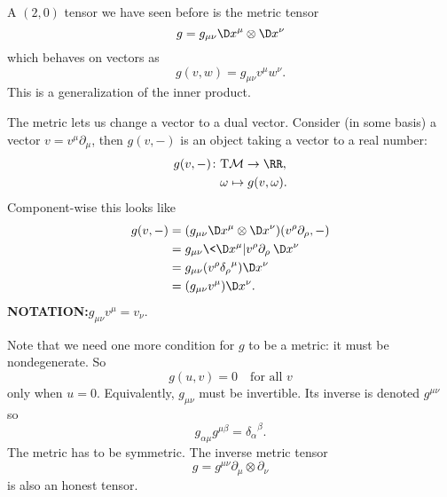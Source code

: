 \begin{ex}
A $(2,0)$ tensor we have seen before is the metric tensor
\begin{equation}
g=g_{\mu\nu}\D x^{\mu}\otimes\D x^{\nu}
\end{equation}
which behaves on vectors as
\begin{equation}
g(v,w)=g_{\mu\nu}v^{\mu}w^{\nu}.
\end{equation}
This is a generalization of the inner product.

The metric lets us change a vector to a dual vector. Consider (in
some basis) a vector $v=v^{\mu}\partial_{\mu}$, then $g(v,-)$ is
an object taking a vector to a real number:
\begin{equation}
\begin{split}
g(v,-)\colon &\mathrm{T}\mathcal{M}\to\RR,\\
&\omega\mapsto g(v,\omega).
\end{split}
\end{equation}
Component-wise this looks like
\begin{subequations}
\begin{align}
g(v,-)
&=(g_{\mu\nu}\D x^{\mu}\otimes\D
x^{\nu})(v^{\rho}\partial_{\rho},-)\\
&=g_{\mu\nu}\<\D x^{\mu}|v^{\rho}\partial_{\rho}\>\D x^{\nu}\\
&=g_{\mu\nu}(v^{\rho}{\delta_{\rho}}^{\mu})\D x^{\nu}\\
&=(g_{\mu\nu}v^{\mu})\D x^{\nu}.
\end{align}
\end{subequations}
\textbf{NOTATION:\quad}\ignorespaces $g_{\mu\nu}v^{\mu}=v_{\nu}$.

Note that we need one more condition for $g$ to be a metric: it
must be nondegenerate. So
\begin{equation}
g(u,v)=0\quad\mbox{for all }v
\end{equation}
only when $u=0$.
Equivalently, $g_{\mu\nu}$ must be invertible. Its inverse is
denoted $g^{\mu\nu}$ so 
\begin{equation}
g_{\alpha\mu}g^{\mu\beta}={\delta_{\alpha}}^{\beta}.
\end{equation}
The metric has to be symmetric. The inverse metric tensor
\begin{equation}
g=g^{\mu\nu}\partial_{\mu}\otimes\partial_{\nu}
\end{equation}
is also an honest tensor.
\end{ex}
